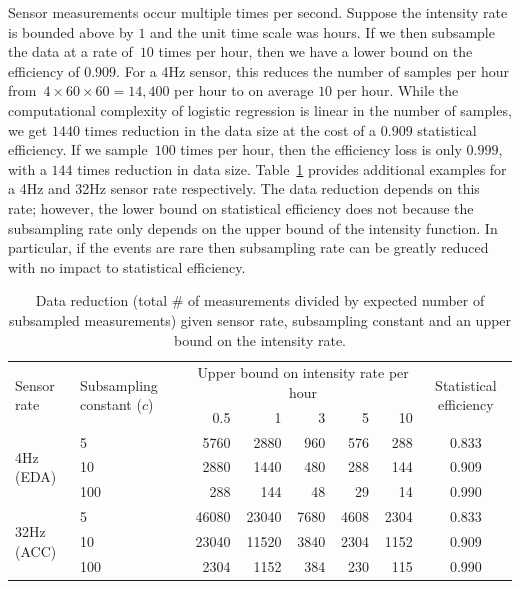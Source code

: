 \documentclass[12pt]{amsart}
\begin{document}
Sensor measurements occur multiple times per second.  Suppose the intensity rate is bounded above by $1$ and the unit time scale was hours. If we then  subsample the data at a rate of~$10$ times per hour, then we have a lower bound on the efficiency of $0.909$. For a 4Hz sensor, this reduces the number of samples per hour from~$4 \times 60 \times 60 = 14,400$ per hour to on average $10$ per hour. While the computational complexity of logistic regression is linear in the number of samples, we get $1440$ times reduction in the data size at the cost of a $0.909$ statistical efficiency. If we sample~$100$ times per hour, then the efficiency loss is only $0.999$, with a $144$ times reduction in data size. Table~\ref{tab:compvseff} provides additional examples for a 4Hz and 32Hz sensor rate respectively.  The data reduction depends on this rate; however, the lower bound on statistical efficiency does not because the subsampling rate only depends on the upper bound of the intensity function. In particular, if the events are rare then subsampling rate can be greatly reduced with no impact to statistical efficiency.

\begin{table}[!th]
\centering
\begin{tabular}{l l r r r r r | c}
\multirow{2}{2.5cm}{Sensor rate} &
\multirow{2}{2.5cm}{Subsampling constant ($c$)}
  & \multicolumn{5}{c}{Upper bound on intensity rate per
    hour}
  & \multirow{2}{2cm}{Statistical efficiency}\\ \cline{3-7}
& & 0.5 & 1 & 3 & 5 & 10 \\ \hline
\multirow{3}{*}{4Hz (EDA)}
& 5 & 5760 & 2880 & 960 & 576 & 288 & 0.833 \\
& 10 & 2880 & 1440 & 480 & 288 & 144 & 0.909 \\
& 100 & 288 & 144 & 48 & 29 & 14 & 0.990 \\ \hline
\multirow{3}{*}{32Hz (ACC)}
& 5 & 46080 & 23040 & 7680 & 4608 & 2304 & 0.833 \\
& 10 & 23040 & 11520 & 3840 & 2304 & 1152 & 0.909 \\
& 100 & 2304 & 1152 & 384 & 230 & 115 & 0.990 \\ \hline
\end{tabular}
\caption{Data reduction (total \# of measurements divided by expected number of subsampled measurements) given sensor rate, subsampling constant and an upper bound on the intensity rate.}
\label{tab:compvseff}
\end{table}
\end{document}
